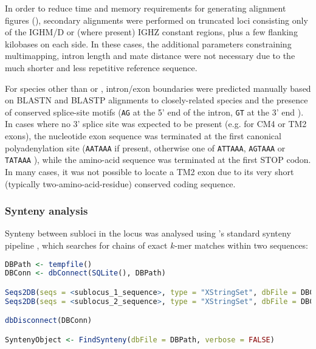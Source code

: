 In order to reduce time and memory requirements for generating alignment figures (), secondary alignments were performed on truncated loci consisting only of the IGHM/D or (where present) IGHZ constant regions, plus a few flanking kilobases on each side. In these cases, the additional parameters constraining multimapping, intron length and mate distance were not necessary due to the much shorter and less repetitive reference sequence.

For species other than \Nfu or \Xma, intron/exon boundaries were predicted manually based on BLASTN and BLASTP alignments to closely-related species and the presence of conserved splice-site motifs (\texttt{AG} at the 5' end of the intron, \texttt{GT} at the 3' end \parencite{shapiro1987splice}). In cases where no 3' splice site was expected to be present (e.g. for CM4 or TM2 exons), the nucleotide exon sequence was terminated at the first canonical polyadenylation site (\texttt{AATAAA} if present, otherwise one of \texttt{ATTAAA}, \texttt{AGTAAA} or \texttt{TATAAA} \parencite{ulitsky2012polya}), while the amino-acid sequence was terminated at the first STOP codon. In many cases, it was not possible to locate a TM2 exon due to its very short (typically two-amino-acid-residue) conserved coding sequence. %

\subsubsection{Synteny analysis}
\label{sec:methods_comp_locus_synteny}

Synteny between subloci in the \Nfu locus was analysed using 's standard synteny pipeline \parencite{wright2016decipher}, which searches for chains of exact $k$-mer matches within two sequences:

\begin{lstlisting}[language=R]
DBPath <- tempfile()
DBConn <- dbConnect(SQLite(), DBPath)

Seqs2DB(seqs = <sublocus_1_sequence>, type = "XStringSet", dbFile = DBConn, identifier = "IGH1", verbose = FALSE)
Seqs2DB(seqs = <sublocus_2_sequence>, type = "XStringSet", dbFile = DBConn, identifier = "IGH2", verbose = FALSE)

dbDisconnect(DBConn)

SyntenyObject <- FindSynteny(dbFile = DBPath, verbose = FALSE)
\end{lstlisting}

